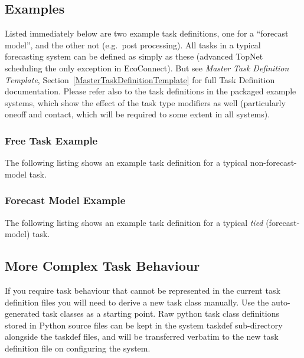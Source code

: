 \documentclass[11pt,a4paper]{article}
\begin{document}
\subsection{Examples}

Listed immediately below are two example task definitions, one for a
``forecast model'', and the other not (e.g.\ post processing). All tasks
in a typical forecasting system can be defined as simply as these
(advanced TopNet scheduling the only exception in EcoConnect). 
But see {\em Master Task Definition Template},
Section~\ref{MasterTaskDefinitionTemplate} for full Task Definition
documentation. Please refer also to the task definitions in the packaged
example systems, which show the effect of the task type modifiers as well
(particularly oneoff and contact, which will be required to some extent
in all systems).


\pagebreak
\subsubsection{Free Task Example}

The following listing shows an example task definition for a
typical non-forecast-model task.
\lstset{language=cylctaskdef}

{

}

\pagebreak
\subsubsection{Forecast Model Example}

The following listing shows an example task definition for a
typical {\em tied} (forecast-model) task.

\lstset{language=cylctaskdef}

{

}


\pagebreak
\subsection{More Complex Task Behaviour}
\label{MoreComplexTaskBehaviour}

If you require task behaviour that cannot be represented in the current 
task definition files you will need to derive a new task class manually.
Use the auto-generated task classes as a starting point. Raw python 
task class definitions stored in Python source files can be 
kept in the system taskdef sub-directory alongside the taskdef files,
and will be transferred verbatim to the new task definition file on 
configuring the system. 
\end{document}
